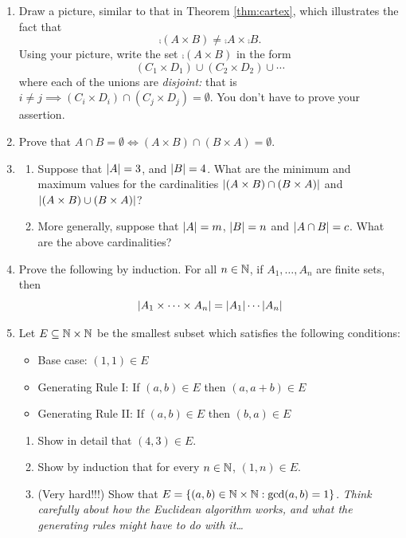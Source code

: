 \begin{exercises}{}{}
\begin{enumerate}
	\item\label{ex:cartneg} Draw a picture, similar to that in Theorem \ref{thm:cartex}, which illustrates the fact that
	\[\comp{(A\times B)}\neq \comp A\times \comp B.\]
	Using your picture, write the set $\comp{(A\times B)}$ in the form
	\[(C_1\times D_1)\cup (C_2\times D_2)\cup\cdots\]
	where each of the unions are \emph{disjoint:} that is $i\neq j\implies (C_i\times D_i)\cap (C_j\times D_j)=\emptyset$. You don't have to prove your assertion.
		
	\item Prove that $A\cap B=\emptyset\iff (A\times B)\cap(B\times A)=\emptyset$.
	
  \item\begin{enumerate}
		\item Suppose that $\left| A\right|=3$, and $\left| B\right|=4$. What are the minimum and maximum values for the cardinalities $\left| (A\times B)\cap(B\times A)\right|$ and $\left| (A\times B)\cup(B\times A)\right|$?
		\item More generally, suppose that $\left| A\right|=m$, $\left| B\right|=n$ and $\left| A\cap B\right|=c$. What are the above cardinalities?
	\end{enumerate}
	
  \item Prove the following by induction. For all $n\in\mathbb{N}$, if $A_1,\ldots,A_n$ are finite sets, then
  \[\left| A_1\times\cdots\times A_n\right|=\left| A_1\right|\cdots\left| A_n\right|\] 
	
	\item Let $E\subseteq\mathbb{N}\times\mathbb{N}$ be the smallest subset which satisfies the following conditions:
	\begin{itemize}
		\item Base case: $(1,1)\in E$
		\item Generating Rule I: If $(a,b)\in E$ then $(a,a+b)\in E$
		\item Generating Rule II: If $(a,b)\in E$ then $(b,a)\in E$
	\end{itemize}

	\begin{enumerate}
		\item Show in detail that $(4,3)\in E$.
		\item Show by induction that for every $n\in\mathbb{N}$, $(1,n)\in E$.
		\item (Very hard!!!) Show that $E=\{(a,b)\in\mathbb{N}\times\mathbb{N}:\gcd(a,b)=1\}$. \emph{Think carefully about how the Euclidean algorithm works, and what the generating rules might have to do with it\ldots}
	\end{enumerate}
	

\end{enumerate}
\end{exercises}
